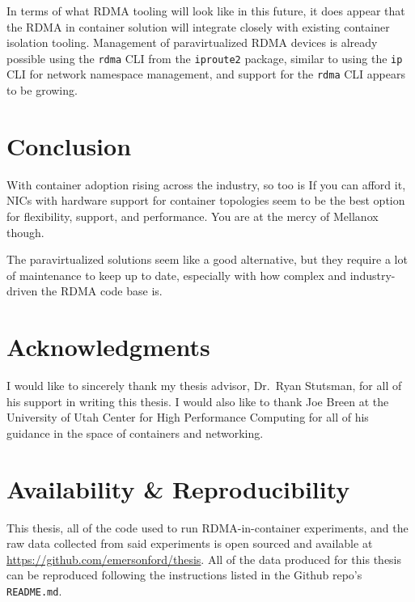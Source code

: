 \documentclass[12pt,titlepage]{article}
\begin{document}
In terms of what RDMA tooling will look like in this future, it does appear that the RDMA in container solution will integrate closely with existing container isolation tooling.
Management of paravirtualized RDMA devices is already possible using the \texttt{rdma} CLI from the \texttt{iproute2} package, similar to using the \texttt{ip} CLI for network namespace management, and support for the \texttt{rdma} CLI appears to be growing.


\section{Conclusion}
With container adoption rising across the industry, so too is 
If you can afford it, NICs with hardware support for container topologies seem to be the best option for flexibility, support, and performance.
You are at the mercy of Mellanox though.

The paravirtualized solutions seem like a good alternative, but they require a lot of maintenance to keep up to date, especially with how complex and industry-driven the RDMA code base is.



\section{Acknowledgments}
I would like to sincerely thank my thesis advisor, Dr.\ Ryan Stutsman, for all of his support in writing this thesis.
I would also like to thank Joe Breen at the University of Utah Center for High Performance Computing for all of his guidance in the space of containers and networking.

\section{Availability \& Reproducibility}
This thesis, all of the code used to run RDMA-in-container experiments, and the raw data collected from said experiments is open sourced and available at \newline\href{https://github.com/emersonford/thesis}{https://github.com/emersonford/thesis}.
All of the data produced for this thesis can be reproduced following the instructions listed in the Github repo's \texttt{README.md}.
\end{document}
